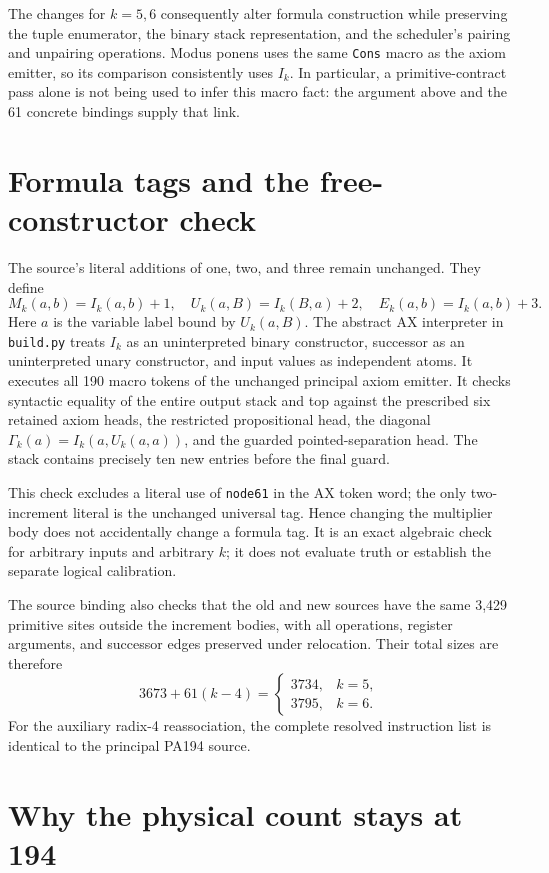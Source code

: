 \documentclass[11pt]{article}
\begin{document}
The changes for $k=5,6$ consequently alter formula construction while
preserving the tuple enumerator, the binary stack representation, and the
scheduler's pairing and unpairing operations.  Modus ponens uses the same
\texttt{Cons} macro as the axiom emitter, so its comparison consistently
uses $I_k$.  In particular, a primitive-contract pass alone is not being
used to infer this macro fact: the argument above and the 61 concrete
bindings supply that link.

\section{Formula tags and the free-constructor check}

The source's literal additions of one, two, and three remain unchanged.
They define
\[
 M_k(a,b)=I_k(a,b)+1,\quad
 U_k(a,B)=I_k(B,a)+2,\quad
 E_k(a,b)=I_k(a,b)+3.
\]
Here $a$ is the variable label bound by $U_k(a,B)$.  The abstract AX
interpreter in \texttt{build.py} treats $I_k$ as an uninterpreted binary
constructor, successor as an uninterpreted unary constructor, and input
values as independent atoms.  It executes all 190 macro tokens of the
unchanged principal axiom emitter.  It checks syntactic equality of the
entire output stack and top against the prescribed six retained axiom
heads, the restricted propositional head, the diagonal
$\Gamma_k(a)=I_k(a,U_k(a,a))$, and the guarded pointed-separation head.
The stack contains precisely ten new entries before the final guard.

This check excludes a literal use of \texttt{node61} in the AX token word;
the only two-increment literal is the unchanged universal tag.  Hence
changing the multiplier body does not accidentally change a formula tag.
It is an exact algebraic check for arbitrary inputs and arbitrary $k$;
it does not evaluate truth or establish the separate logical calibration.

The source binding also checks that the old and new sources have the same
3,429 primitive sites outside the increment bodies, with all operations,
register arguments, and successor edges preserved under relocation.
Their total sizes are therefore
\[
 3673+61(k-4)=
 \begin{cases}3734,&k=5,\\3795,&k=6.\end{cases}
\]
For the auxiliary radix-4 reassociation, the complete resolved instruction
list is identical to the principal PA194 source.

\section{Why the physical count stays at 194}
\end{document}
